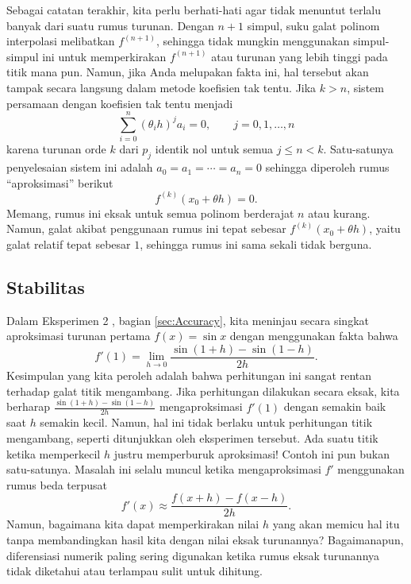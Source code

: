 Sebagai catatan terakhir, kita perlu berhati-hati agar tidak menuntut
terlalu banyak dari suatu rumus turunan. Dengan $n+1$ simpul, suku
galat polinom interpolasi melibatkan $f^{(n+1)}$, sehingga tidak
mungkin menggunakan simpul-simpul ini untuk memperkirakan $f^{(n+1)}$
atau turunan yang lebih tinggi pada titik mana pun. Namun, jika Anda
melupakan fakta ini, hal tersebut akan tampak secara langsung dalam
metode koefisien tak tentu. Jika $k>n$, sistem persamaan dengan koefisien
tak tentu menjadi
\[
\sum_{i=0}^{n}(\theta_{i}h)^{j}a_{i}=0,\qquad j=0,1,\ldots,n
\]
karena turunan orde $k$ dari $p_{j}$ identik nol untuk semua $j\leq n<k$.
Satu-satunya penyelesaian sistem ini adalah $a_{0}=a_{1}=\cdots=a_{n}=0$
sehingga diperoleh rumus ``aproksimasi'' berikut
\[
f^{(k)}(x_{0}+\theta h)=0.
\]
Memang, rumus ini eksak untuk semua polinom berderajat $n$ atau kurang.
Namun, galat akibat penggunaan rumus ini tepat sebesar $f^{(k)}(x_{0}+\theta h)$,
yaitu galat relatif tepat sebesar $1$, sehingga rumus ini sama sekali
tidak berguna.

\subsection{Stabilitas}

Dalam Eksperimen 2 , bagian
\ref{sec:Accuracy}, kita meninjau secara singkat aproksimasi turunan
pertama $f(x)=\sin x$ dengan menggunakan fakta bahwa
\[
f'(1)=\lim_{h\to0}\frac{\sin(1+h)-\sin(1-h)}{2h}.
\]
Kesimpulan yang kita peroleh adalah bahwa perhitungan ini sangat rentan
terhadap galat titik mengambang. Jika perhitungan dilakukan secara
eksak, kita berharap $\frac{\sin(1+h)-\sin(1-h)}{2h}$ mengaproksimasi
$f'(1)$ dengan semakin baik saat $h$ semakin kecil. Namun, hal ini
tidak berlaku untuk perhitungan titik mengambang, seperti ditunjukkan
oleh eksperimen tersebut. Ada suatu titik ketika memperkecil $h$
justru memperburuk aproksimasi! Contoh ini pun bukan satu-satunya.
Masalah ini selalu muncul ketika mengaproksimasi $f'$ menggunakan
rumus beda terpusat
\begin{equation}
f'(x)\approx\frac{f(x+h)-f(x-h)}{2h}.\label{eq:centeredDifference}
\end{equation}
Namun, bagaimana kita dapat memperkirakan nilai $h$ yang akan memicu
hal itu tanpa membandingkan hasil kita dengan nilai eksak turunannya?
Bagaimanapun, diferensiasi numerik paling sering digunakan ketika
rumus eksak turunannya tidak diketahui atau terlampau sulit untuk
dihitung.

